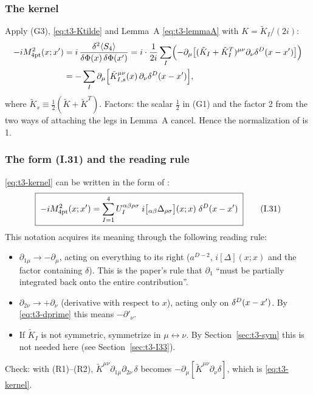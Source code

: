 \subsubsection{The kernel}
Apply (G3), \eqref{eq:t3-Ktilde} and Lemma~A \eqref{eq:t3-lemmaA} with \(K=\tilde K_I/(2i)\):
\begin{equation}\label{eq:t3-kernel}
\begin{aligned}
-iM^2_{\rm 4pt}(x;x')&=i\,\frac{\delta^2\langle S_4\rangle}{\delta\Phi(x)\,\delta\Phi(x')}
=i\cdot\frac1{2i}\sum_I\Bigl(-\partial_\mu\bigl[(\tilde K_I+\tilde K_I^T)^{\mu\nu}\partial_\nu\delta^D(x-x')\bigr]\Bigr)\\
&=-\sum_I\partial_\mu\Bigl[\tilde K_{I,s}^{\mu\nu}(x)\,\partial_\nu\delta^D(x-x')\Bigr],
\end{aligned}
\end{equation}
where \(\tilde K_s\equiv\tfrac12(\tilde K+\tilde K^T)\). Factors: the scalar \(\tfrac12\) in
(G1) and the factor 2 from the two ways of attaching the legs in Lemma~A cancel. Hence
the normalization of  is 1.

\subsubsection{The form (I.31) and the reading rule}\label{sec:t3-rule}
\eqref{eq:t3-kernel} can be written in the form of :
\begin{equation*}\label{eq:t3-I31}
\boxed{\;-iM^2_{\rm 4pt}(x;x')=\sum_{I=1}^4U_I^{\alpha\beta\rho\sigma}\;i\bigl[{}_{\alpha\beta}\Delta_{\rho\sigma}\bigr](x;x)\;\delta^D(x-x')\;}
\tag{I.31}
\end{equation*}
This notation acquires its meaning through the following reading rule:
\begin{itemize}[leftmargin=2.6em]
\item[(R1)] \(\partial_{1\mu}\to-\partial_\mu\), acting on everything to its right
(\(a^{D-2}\), \(i[\Delta](x;x)\) and the factor containing \(\delta\)). This is the paper's
rule that \(\partial_1\) ``must be partially integrated back onto the entire contribution''.
\item[(R2)] \(\partial_{2\nu}\to+\partial_\nu\) (derivative with respect to \(x\)), acting only
on \(\delta^D(x-x')\). By \eqref{eq:t3-dprime} this means \(-\partial'_\nu\).
\item[(R3)] If \(\tilde K_I\) is not symmetric, symmetrize in \(\mu\leftrightarrow\nu\). By
Section~\ref{sec:t3-sym} this is not needed here (see Section~\ref{sec:t3-I33}).
\end{itemize}
Check: with (R1)--(R2), \(\tilde K^{\mu\nu}\partial_{1\mu}\partial_{2\nu}\,\delta\) becomes
\(-\partial_\mu[\tilde K^{\mu\nu}\partial_\nu\delta]\), which is \eqref{eq:t3-kernel}.


